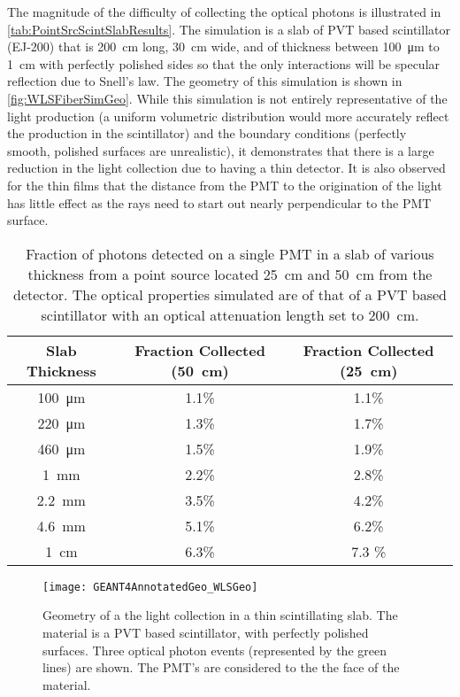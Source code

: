 The magnitude of the difficulty of collecting the optical photons is illustrated in \autoref{tab:PointSrcScintSlabResults}.
The simulation is a slab of PVT based scintillator (EJ-200) that is  \SI{200}{\cm} long, \SI{30}{\cm} wide, and of thickness between \SI{100}{\um} to \SI{1}{\cm} with perfectly polished sides so that the only interactions will be specular reflection due to Snell's law.
The geometry of this simulation is shown in \autoref{fig:WLSFiberSimGeo}.
While this simulation is not entirely representative of the light production (a uniform volumetric distribution would more accurately reflect the production in the scintillator) and the boundary conditions (perfectly smooth, polished surfaces are unrealistic), it demonstrates that there is a large reduction in the light collection due to having a thin detector.
It is also observed for the thin films that the distance from the PMT to the origination of the light has little effect as the rays need to start out nearly perpendicular to the PMT surface.
\begin{table}
	\caption[Fraction of Photons Detected from a Point Source on a single PMT]{Fraction of photons detected on a single PMT in a slab of various thickness from a point source located \SI{25}{\cm} and \SI{50}{\cm} from the detector.  The optical properties simulated are of that of a PVT based scintillator with an optical attenuation length set to \SI{200}{\cm}.}
	\label{tab:PointSrcScintSlabResults}
	\begin{tabular}{c | c  c}
	\toprule
	Slab Thickness & Fraction Collected (\SI{50}{\cm}) & Fraction Collected (\SI{25}{\cm}) \\
	\midrule
	\SI{100}{\um} & 1.1\% & 1.1\% \\
	\SI{220}{\um} & 1.3\% & 1.7\% \\
	\SI{460}{\um} & 1.5\% & 1.9\% \\
	\SI{1}{\mm} & 2.2\% & 2.8\% \\
	\SI{2.2}{\mm} & 3.5\% & 4.2\% \\
	\SI{4.6}{\mm} & 5.1\% & 6.2\% \\
	\SI{1}{\cm} & 6.3\% & 7.3 \% \\
	\bottomrule
	\end{tabular}
\end{table}
\begin{figure}
	\centering
	\texttt{[image: GEANT4AnnotatedGeo\_WLSGeo]}
	\caption[Thin Slab Light Collection Geometry]{Geometry of a the light collection in a thin scintillating slab. The material is a PVT based scintillator, with perfectly polished surfaces. Three optical photon events (represented by the green lines) are shown. The PMT's are considered to the the face of the material.}
	\label{fig:WLSFiberSimGeo}
\end{figure}
